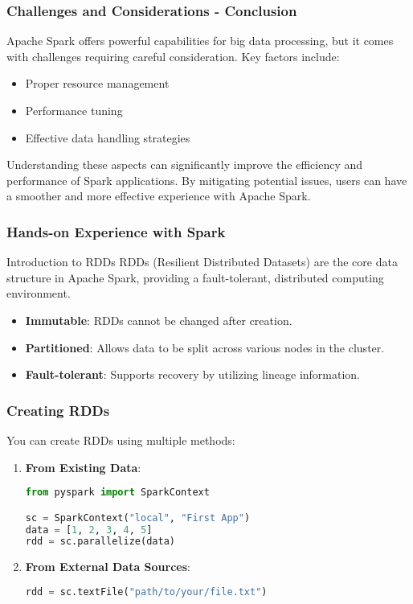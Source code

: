 \documentclass[aspectratio=169]{beamer}
\begin{document}
\begin{frame}[fragile]
    \frametitle{Challenges and Considerations - Conclusion}
    Apache Spark offers powerful capabilities for big data processing, but it comes with challenges requiring careful consideration. Key factors include:
    
    \begin{itemize}
        \item Proper resource management
        \item Performance tuning
        \item Effective data handling strategies
    \end{itemize}
    
    Understanding these aspects can significantly improve the efficiency and performance of Spark applications. By mitigating potential issues, users can have a smoother and more effective experience with Apache Spark.
\end{frame}

\begin{frame}
    \frametitle{Hands-on Experience with Spark}
    \begin{block}{Introduction to RDDs}
        RDDs (Resilient Distributed Datasets) are the core data structure in Apache Spark, providing a fault-tolerant, distributed computing environment. 
    \end{block}
    \begin{itemize}
        \item \textbf{Immutable}: RDDs cannot be changed after creation.
        \item \textbf{Partitioned}: Allows data to be split across various nodes in the cluster.
        \item \textbf{Fault-tolerant}: Supports recovery by utilizing lineage information.
    \end{itemize}
\end{frame}

\begin{frame}[fragile]
    \frametitle{Creating RDDs}
    You can create RDDs using multiple methods:
    \begin{enumerate}
        \item \textbf{From Existing Data}:
        \begin{lstlisting}[language=Python]
from pyspark import SparkContext

sc = SparkContext("local", "First App")
data = [1, 2, 3, 4, 5]
rdd = sc.parallelize(data)
        \end{lstlisting}
        
        \item \textbf{From External Data Sources}:
        \begin{lstlisting}[language=Python]
rdd = sc.textFile("path/to/your/file.txt")
        \end{lstlisting}
    \end{enumerate}
\end{frame}
\end{document}

